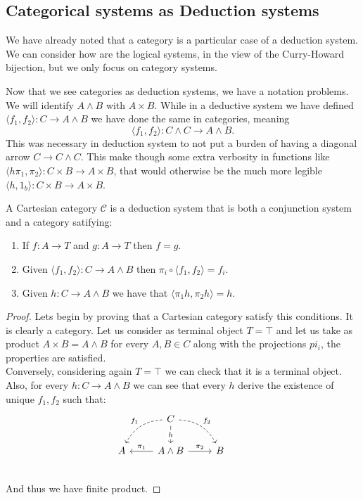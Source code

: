 \subsection{Categorical systems as Deduction systems}

We have already noted that a category is a particular case of a deduction system. We can consider how are the logical systems, in the view of the Curry-Howard bijection, but we only focus on category systems.

\begin{remark}Now that  we see categories as deduction systems, we have a notation problems. We will identify $A\land B$ with $A\times B$. While in a deductive system we have defined $\langle f_1,f_2\rangle : C \to A\land B$ we have done the same in categories, meaning $$\langle f_1,f_2\rangle : C \land C \to A \land B.$$  This was necessary in deduction system to not put a burden of having a diagonal arrow $C\to C\land C$. This make though some extra verbosity in functions like $\langle h\pi_1, \pi_2\rangle : C\times B \to A\times B$, that would otherwise be the much more legible $\langle h, 1_b\rangle: C\times B \to A \times B$. 
\end{remark}


\begin{proposition}\label{prop:CartCategory2}
  A Cartesian category $\mathcal{C}$ is a deduction system that is both a conjunction system and a category satifying:
  \begin{enumerate}
  \item If $f:A\to T$ and $g:A\to T$ then $f=g$.
  \item Given $\langle f_1,f_2\rangle: C\to A\land B$ then $\pi_i \circ \langle f_1,f_2\rangle = f_i$.
  \item Given $h:C\to A\land B$ we have that $\langle \pi_1 h, \pi_2 h\rangle = h$.
  \end{enumerate}
\end{proposition}

\begin{proof}

  Lets begin by proving that a Cartesian category satisfy this conditions. It is clearly a category. Let us consider as terminal object $T=\top$ and let us take as product $A\times B = A\land B$ for every $A,B \in C$ along with the projections $pi_i$, the properties are satisfied.\\

  Conversely, considering again $T= \top$ we can check that it is a terminal object. Also, for every $h:C\to A\land B$ we can see that every $h$ derive the existence of unique $f_1,f_2$ such that:
  \[
    \begin{tikzcd}
      {} & C \arrow[bend right,swap,dashed]{dl}{f_1}
      \arrow[bend left,dashed]{dr}{f_2} \arrow{d}[description]{h}& & \\
      A  &A\land B \arrow{l}[swap]{\pi_1} \arrow{r}{\pi_2} & 
      B \\
    \end{tikzcd}
  \]
  And thus we have finite product.
\end{proof}

